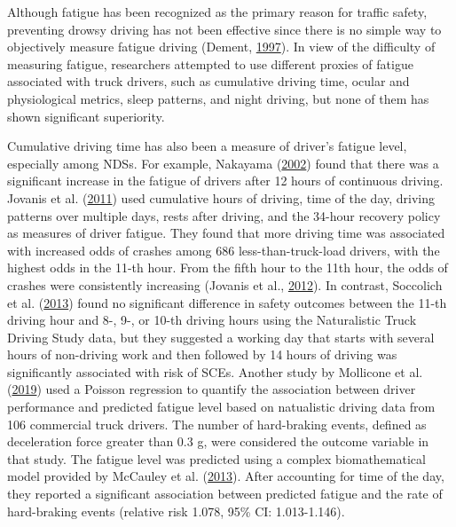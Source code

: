 \documentclass[12pt]{book}
\numberwithin{equation}{chapter}
\begin{document}
Although fatigue has been recognized as the primary reason for traffic safety, preventing drowsy driving has not been effective since there is no simple way to objectively measure fatigue driving (Dement, \protect\hyperlink{ref-dement1997perils}{1997}). In view of the difficulty of measuring fatigue, researchers attempted to use different proxies of fatigue associated with truck drivers, such as cumulative driving time, ocular and physiological metrics, sleep patterns, and night driving, but none of them has shown significant superiority.

Cumulative driving time has also been a measure of driver's fatigue level, especially among NDSs. For example, Nakayama (\protect\hyperlink{ref-nakayama2002trial}{2002}) found that there was a significant increase in the fatigue of drivers after 12 hours of continuous driving. Jovanis et al. (\protect\hyperlink{ref-jovanis2011hours}{2011}) used cumulative hours of driving, time of the day, driving patterns over multiple days, rests after driving, and the 34-hour recovery policy as measures of driver fatigue. They found that more driving time was associated with increased odds of crashes among 686 less-than-truck-load drivers, with the highest odds in the 11-th hour. From the fifth hour to the 11th hour, the odds of crashes were consistently increasing (Jovanis et al., \protect\hyperlink{ref-jovanis2012effects}{2012}). In contrast, Soccolich et al. (\protect\hyperlink{ref-soccolich2013analysis}{2013}) found no significant difference in safety outcomes between the 11-th driving hour and 8-, 9-, or 10-th driving hours using the Naturalistic Truck Driving Study data, but they suggested a working day that starts with several hours of non-driving work and then followed by 14 hours of driving was significantly associated with risk of SCEs. Another study by Mollicone et al. (\protect\hyperlink{ref-mollicone2019predicting}{2019}) used a Poisson regression to quantify the association between driver performance and predicted fatigue level based on natualistic driving data from 106 commercial truck drivers. The number of hard-braking events, defined as deceleration force greater than 0.3 g, were considered the outcome variable in that study. The fatigue level was predicted using a complex biomathematical model provided by McCauley et al. (\protect\hyperlink{ref-mccauley2013dynamic}{2013}). After accounting for time of the day, they reported a significant association between predicted fatigue and the rate of hard-braking events (relative risk 1.078, 95\% CI: 1.013-1.146).
\end{document}
